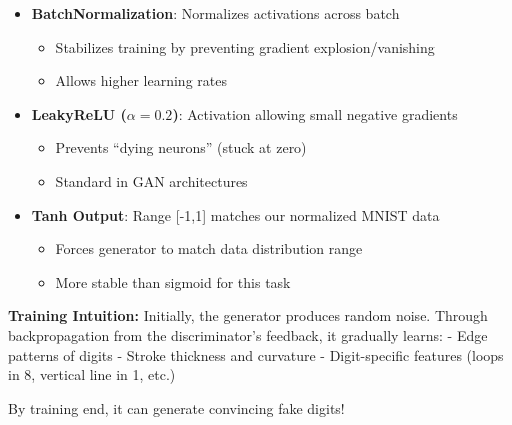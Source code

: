 \documentclass[11pt]{article}
\providecommand{\tightlist}{%
      \setlength{\itemsep}{0pt}\setlength{\parskip}{0pt}}
\begin{document}
\begin{itemize}
\tightlist
\item
  \textbf{BatchNormalization}: Normalizes activations across batch

  \begin{itemize}
  \tightlist
  \item
    Stabilizes training by preventing gradient explosion/vanishing
  \item
    Allows higher learning rates
  \end{itemize}
\item
  \textbf{LeakyReLU (\(\alpha = 0.2\))}: Activation allowing small
  negative gradients

  \begin{itemize}
  \tightlist
  \item
    Prevents ``dying neurons'' (stuck at zero)
  \item
    Standard in GAN architectures
  \end{itemize}
\item
  \textbf{Tanh Output}: Range {[}-1,1{]} matches our normalized MNIST
  data

  \begin{itemize}
  \tightlist
  \item
    Forces generator to match data distribution range
  \item
    More stable than sigmoid for this task
  \end{itemize}
\end{itemize}

\textbf{Training Intuition:} Initially, the generator produces random
noise. Through backpropagation from the discriminator's feedback, it
gradually learns: - Edge patterns of digits - Stroke thickness and
curvature - Digit-specific features (loops in 8, vertical line in 1,
etc.)

By training end, it can generate convincing fake digits!
\end{document}
